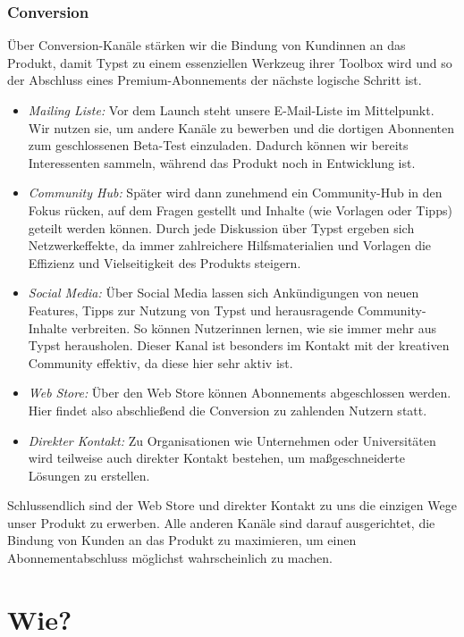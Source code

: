 \documentclass[11pt, a4paper]{article}
\newcommand{\gender}{\raisebox{-.25em}{*}}
\let\oldsection\section
\renewcommand\section{\clearpage\oldsection}
\renewcommand{\glossary} {\marginsymbol{$\hookrightarrow$}}
\newcommand{\marginsymbol}[1] {\protect\marginsymbolhelper{#1}}
\newcommand{\marginsymbolhelper}[1] {\tabto*{-1cm}\makebox[0cm]{#1}\tabto*{\TabPrevPos}}
\begin{document}
\subsubsection*{Conversion}


Über \glossary Conversion-Kanäle stärken wir die Bindung von Kund\gender{}innen an das Produkt, damit Typst zu einem essenziellen Werkzeug ihrer Toolbox wird und so der Abschluss eines Premium-Abonnements der nächste logische Schritt ist. 

\begin{itemize}
    \item \emph{Mailing Liste:}  Vor dem Launch steht unsere E-Mail-Liste im Mittelpunkt. Wir nutzen sie, um andere Kanäle zu bewerben und die dortigen Abonnenten zum geschlossenen Beta-Test einzuladen. Dadurch können wir bereits Interessenten sammeln, während das Produkt noch in Entwicklung ist.
    \item \emph{Community Hub:} Später wird dann zunehmend ein Community-Hub in den Fokus rücken, auf dem Fragen gestellt und Inhalte (wie Vorlagen oder Tipps) geteilt werden können. Durch jede Diskussion über Typst ergeben sich Netzwerkeffekte, da immer zahlreichere Hilfsmaterialien und Vorlagen die Effizienz und Vielseitigkeit des Produkts steigern.
    \item \emph{Social Media:} Über Social Media lassen sich Ankündigungen von neuen Features, Tipps zur Nutzung von Typst und herausragende Community-Inhalte verbreiten. So können Nutzer\gender{}innen lernen, wie sie immer mehr aus Typst herausholen. Dieser Kanal ist besonders im Kontakt mit der kreativen Community effektiv, da diese hier sehr aktiv ist.
    \item \emph{Web Store:} Über den Web Store können Abonnements abgeschlossen werden. Hier findet also abschließend die Conversion zu zahlenden Nutzern statt.
    \item \emph{Direkter Kontakt:} Zu Organisationen wie Unternehmen oder Universitäten wird teilweise auch direkter Kontakt bestehen, um maßgeschneiderte Lösungen zu erstellen.
\end{itemize}


Schlussendlich sind der Web Store und direkter Kontakt zu uns die einzigen Wege unser Produkt zu erwerben. Alle anderen Kanäle sind darauf ausgerichtet, die Bindung von Kunden an das Produkt zu maximieren, um einen Abonnementabschluss möglichst wahrscheinlich zu machen.

\section*{Wie?}
\end{document}
